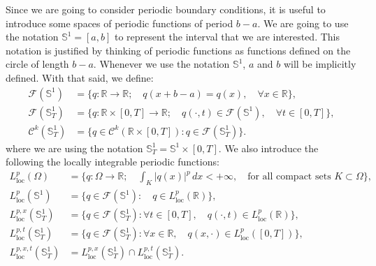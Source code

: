 Since we are going to consider periodic boundary conditions, it is useful to introduce some
spaces of periodic functions of period $b-a$. We are going to use the notation $\mathbb{S}^1=[a,b]$
to represent the interval that we are interested. 
This notation is justified by thinking of periodic functions as functions defined on the circle of length $b-a$.
Whenever we use the notation $\mathbb{S}^1$, $a$ and $b$ will be implicitly defined.
With that said, we define:
\begin{align*}
	\mathcal{F}(\mathbb{S}^1) &= \{q:\mathbb{R} \to \mathbb{R};\quad q(x+b-a) = q(x), \quad \forall x \in \mathbb{R}\},\\
	\mathcal{F}(\mathbb{S}^1_{T}) &= \{q:\mathbb{R}\times[0,T]\to \mathbb{R};\quad q(\cdot,t) \in \mathcal{F}(\mathbb{S}^1), \quad \forall t \in [0,T]\},\\
	\mathcal{C}^k(\mathbb{S}^1_{T}) &= \{q\in \mathcal{C}^k(\mathbb{R}\times[0,T]): q \in \mathcal{F}(\mathbb{S}^1_{T})\}.
\end{align*}
where we are using the notation $\mathbb{S}^1_{T} = \mathbb{S}^1\times[0,T]$. 
We also introduce the following the locally integrable periodic functions:
\begin{align*}
	L^p_{\text{loc}}(\Omega) &= \{q:\Omega\to \mathbb{R};\quad \int_{K} |q(x)|^p\,dx < +\infty, \quad \text{for all compact sets } K \subset \Omega\},\\
	{L}^{p}_{\text{loc}}(\mathbb{S}^1) &= \{q\in \mathcal{F}(\mathbb{S}^1): \quad  q \in L^p_{\text{loc}}(\mathbb{R})\},\\
	{L}^{p,x}_{\text{loc}}(\mathbb{S}^1_{T}) &= \{q\in \mathcal{F}(\mathbb{S}^1_{T}): \forall t \in [0,T], \quad q(\cdot,t) \in L^p_{\text{loc}}(\mathbb{R})\},\\
	{L}^{p,t}_{\text{loc}}(\mathbb{S}^1_{T}) &= \{q\in \mathcal{F}(\mathbb{S}^1_{T}): \forall x \in \mathbb{R},\quad q(x,\cdot) \in L^p_{\text{loc}}([0,T])\},\\
	{L}^{p,x,t}_{\text{loc}}(\mathbb{S}^1_{T}) &= {L}^{p,x}_{\text{loc}}(\mathbb{S}^1_{T}) \cap {L}^{p,t}_{\text{loc}}(\mathbb{S}^1_{T}).
\end{align*}
